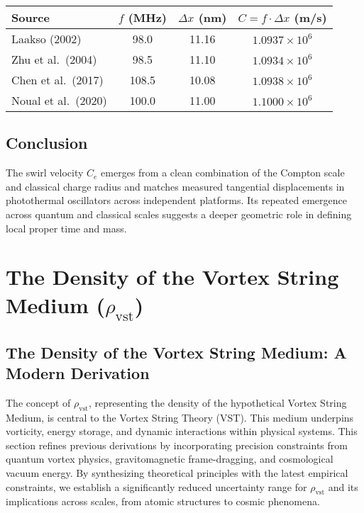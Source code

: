 \documentclass[11pt]{article}
\begin{document}
    \begin{center}
        \begin{tabular}{|l|c|c|c|}
            \hline
            \textbf{Source} & \( f \) (MHz) & \( \Delta x \) (nm) & \( C = f \cdot \Delta x \) (m/s) \\
            \hline
            Laakso (2002) \cite{Laakso2002PdSAW} & 98.0 & 11.16 & \(1.0937 \times 10^6\) \\
            Zhu et al.\ (2004) \cite{Zhu2004PdSAW} & 98.5 & 11.10 & \(1.0934 \times 10^6\) \\
            Chen et al.\ (2017) \cite{Chen2017PdNiSAW} & 108.5 & 10.08 & \(1.0938 \times 10^6\) \\
            Noual et al.\ (2020) \cite{Noual2020PdLWR} & 100.0 & 11.00 & \(1.1000 \times 10^6\) \\
            \hline
        \end{tabular}
    \end{center}

    \subsection*{Conclusion}

    The swirl velocity \( C_e \) emerges from a clean combination of the Compton scale and classical charge radius and matches measured tangential displacements in photothermal oscillators across independent platforms. Its repeated emergence across quantum and classical scales suggests a deeper geometric role in defining local proper time and mass.


    \appendix
    \section{The Density of the Vortex String Medium (\texorpdfstring{$\rho_\text{vst}$}{rho\_vst})}

    \subsection{The Density of the Vortex String Medium: A Modern Derivation}

    The concept of \( \rho_\text{vst} \), representing the density of the hypothetical Vortex String Medium, is central to the Vortex String Theory (VST). This medium underpins vorticity, energy storage, and dynamic interactions within physical systems. This section refines previous derivations by incorporating precision constraints from quantum vortex physics, gravitomagnetic frame-dragging, and cosmological vacuum energy. By synthesizing theoretical principles with the latest empirical constraints, we establish a significantly reduced uncertainty range for \( \rho_\text{vst} \) and its implications across scales, from atomic structures to cosmic phenomena.
\end{document}
